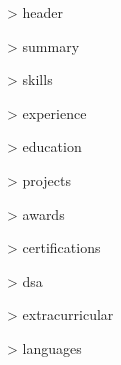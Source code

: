 \documentclass[letterpaper,{{theme.designSystem.baseFontSize}}]{article}
\begin{document}
{{> header}}

{{> summary}}

{{> skills}}

{{> experience}}

{{> education}}

{{> projects}}

{{> awards}}

{{> certifications}}

{{> dsa}}

{{> extracurricular}}

{{> languages}}
\end{document}
